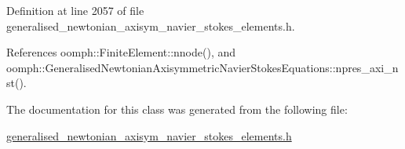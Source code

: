 Definition at line 2057 of file generalised\+\_\+newtonian\+\_\+axisym\+\_\+navier\+\_\+stokes\+\_\+elements.\+h.



References oomph\+::\+Finite\+Element\+::nnode(), and oomph\+::\+Generalised\+Newtonian\+Axisymmetric\+Navier\+Stokes\+Equations\+::npres\+\_\+axi\+\_\+nst().



The documentation for this class was generated from the following file\+:\begin{DoxyCompactItemize}
\item 
\hyperlink{generalised__newtonian__axisym__navier__stokes__elements_8h}{generalised\+\_\+newtonian\+\_\+axisym\+\_\+navier\+\_\+stokes\+\_\+elements.\+h}\end{DoxyCompactItemize}
